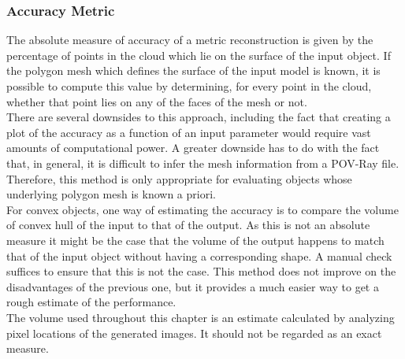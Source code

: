 \documentclass[12pt,a4paper,twoside,openright]{report}
\begin{document}
\subsubsection{Accuracy Metric}
The absolute measure of accuracy of a metric reconstruction is given by the percentage of points in the cloud which lie on the surface of the input object.
If the polygon mesh which defines the surface of the input model is known, it is possible to compute this value by determining, for every point in the cloud, whether that point lies on any of the faces of the mesh or not.\\
There are several downsides to this approach, including the fact that creating a plot of the accuracy as a function of an input parameter would require vast amounts of computational power. A greater downside has to do with the fact that, in general, it is difficult to infer the mesh information from a POV-Ray file.  Therefore, this method is only appropriate for evaluating objects whose underlying polygon mesh is known a priori.\\
\linebreak
For convex objects, one way of estimating the accuracy is to compare the volume of convex hull of the input to that of the output. As this is not an absolute measure it might be the case that the volume of the output happens to match that of the input object without having a corresponding shape. A manual check suffices to ensure that this is not the case. This method does not improve on the disadvantages of the previous one, but it provides a much easier way to get a rough estimate of the performance.\\
The volume used throughout this chapter is an estimate calculated by analyzing pixel locations of the generated images. It should not be regarded as an exact measure.
\end{document}
